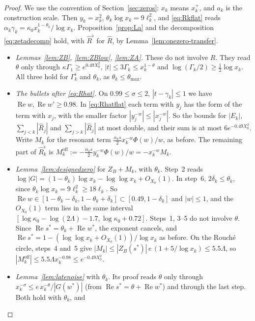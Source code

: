 \begin{proof}
We use the convention of Section~\ref{sec:zeros}: $x_k$ means $x_k^+$, and $a_k$ is the construction scale. Then $y_k=x_k^2$,
$\theta_k\log x_k=9\ell_k^2$, and \eqref{eq:Rkflat} reads $\alpha_k\gamma_k=\kappa_0x_k^{1-\theta_k}/\log x_k$. Proposition~\ref{prop:La} and the
decomposition \eqref{eq:zetadecomp} hold, with $\widehat R^\flat$ for $\widehat R$, by Lemma~\ref{lem:onezero-transfer}.
\begin{itemize}
\item \emph{Lemmas~\ref{lem:ZB}, \ref{lem:ZBlow}, \ref{lem:ZA}.} These do not involve $R$. They read $\theta$ only through
$\kappa\Gamma_1\ge e^{0.49X_0^2}$, $|t|\le3\Gamma_k\le x_k^{1-\theta}$ and $\log(\Gamma_k/2)\ge\frac12\log x_k$. All three hold for
$\Gamma_k^\flat$ and $\theta_k$, as $\theta_k\le\theta_{\max}$.
\item \emph{The bullets after \eqref{eq:Rhat}.} On $0.99\le\sigma\le2$, $|t-\gamma_k|\le1$ we have $\operatorname{Re}w,\operatorname{Re}w'\ge0.98$.
In \eqref{eq:Rhatflat} each term with $y_j$ has the form of the term with $x_j$, with the smaller factor
$|y_j^{-w}|\le|x_j^{-w}|$. So the bounds for $|E_k|$, $\sum_{j<k}|\widehat R_j|$ and $\sum_{j>k}|\widehat R_j|$ at most double, and
their sum is at most $6e^{-0.49X_0^2}$. Write $M_k$ for the resonant term $\frac{\alpha_ks}2x_k^{-w}\Phi(w)/w$, as before. The remaining
part of $\widehat R_k^\flat$ is $M_k^{\mathrm{off}}:=-\frac{\alpha_ks}2y_k^{-w}\Phi(w)/w=-x_k^{-w}M_k$.
\item \emph{Lemma~\ref{lem:designedzero}} for $Z_B+M_k$, with $\theta_k$. Step~2 reads
$\log|G|=(1-\theta_k)\log x_k-\log\log x_k+O_{X_0}(1)$. In step~6, $2\delta_k\le\theta_k$, since $\theta_k\log x_k=9\ell_k^2\ge18\ell_k$. So
$\operatorname{Re}w\in[1-\theta_k-\delta_k,1-\theta_k+\delta_k]\subset[0.49,1-\delta_k]$ and $|w|\le1$, and the $O_{X_0}(1)$ term lies in the
same interval $[\log\kappa_0-\log(2\Lambda)-1.7,\log\kappa_0+0.72]$. Steps~1, 3--5 do not involve $\theta$. Since
$\operatorname{Re}s^*=\theta_k+\operatorname{Re}w^*$, the exponent cancels, and $\operatorname{Re}s^*=1-(\log\log x_k+O_{X_0}(1))/\log x_k$
as before. On the Rouch\'e circle, steps~4 and~5 give $|M_k|\le|Z_B(s^*)|\,e\,(1+5/\log x_k)\le5.5\Lambda$, so
$|M_k^{\mathrm{off}}|\le5.5\Lambda x_k^{-0.98}\le e^{-0.49X_0^2}$.
\item \emph{Lemma~\ref{lem:latenoise}} with $\theta_k$. Its proof reads $\theta$ only through $x_k^{-\sigma}\le e\,x_k^{-\theta}/|G(w^*)|$
(from $\operatorname{Re}s^*=\theta+\operatorname{Re}w^*$) and through the last step. Both hold with $\theta_k$, and

\end{itemize}
\end{proof}
